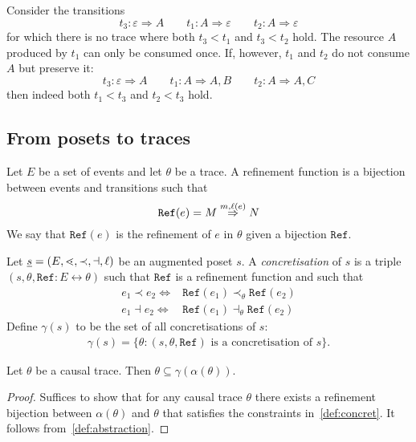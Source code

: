\begin{example}
  Consider the transitions
  \[
  t_3: \varepsilon \Rightarrow A\qquad t_1: A\Rightarrow \varepsilon \qquad t_2: A\Rightarrow \varepsilon
  \]
  for which there is no trace where both $t_3<t_1$ and $t_3<t_2$ hold. The resource $A$ produced by $t_1$ can only be consumed once.
  If, however, $t_1$ and $t_2$ do not consume $A$ but preserve it:
  \[
  t_3: \varepsilon \Rightarrow A\qquad t_1: A\Rightarrow A,B \qquad t_2: A\Rightarrow A,C
  \]
  then indeed both $t_1<t_3$ and $t_2<t_3$ hold.
\end{example}

\subsection{From posets to traces}

\begin{definition}
  Let $E$ be a set of events and let $\theta$ be a trace. A refinement function is a bijection between events and transitions such that
  \[
  \mathtt{Ref}(e) = M\overset{m,\ell(e)}{\Rightarrow}N
  \]
  We say that $\mathtt{Ref}(e)$ is the refinement of $e$ in $\theta$ given a bijection $\mathtt{Ref}$.
\end{definition}

\begin{definition}
  \label{def:concret}
  Let $\underline s=(E,\lessdot,\prec,\dashv,\ell)$ be an augmented poset $s$.
  A \emph{concretisation} of $s$ is a triple $(s,\theta,\mathtt{Ref}:E\leftrightarrow\theta)$ such that $\mathtt{Ref}$ is a refinement function and such that
  \begin{align*}
    e_1\prec e_2 \iff& \mathtt{Ref}(e_1) \prec_{\theta}\mathtt{Ref}(e_2)\\
    e_1\dashv e_2 \iff& \mathtt{Ref}(e_1) \dashv_{\theta}\mathtt{Ref}(e_2)
  \end{align*}
  Define $\gamma(s)$ to be the set of all concretisations of $s$:
  \begin{align*}
    \gamma(s) = \{\theta: (s,\theta,\mathtt{Ref})\text{ is a concretisation of }s\}.
  \end{align*}
\end{definition}

\begin{theorem}
  Let $\theta$ be a causal trace. Then $\theta\subseteq\gamma(\alpha(\theta))$.
\end{theorem}
\begin{proof}
  Suffices to show that for any causal trace $\theta$ there exists a refinement bijection between $\alpha(\theta)$ and $\theta$ that satisfies the constraints in~\autoref{def:concret}. It follows from~\autoref{def:abstraction}.
\end{proof}

